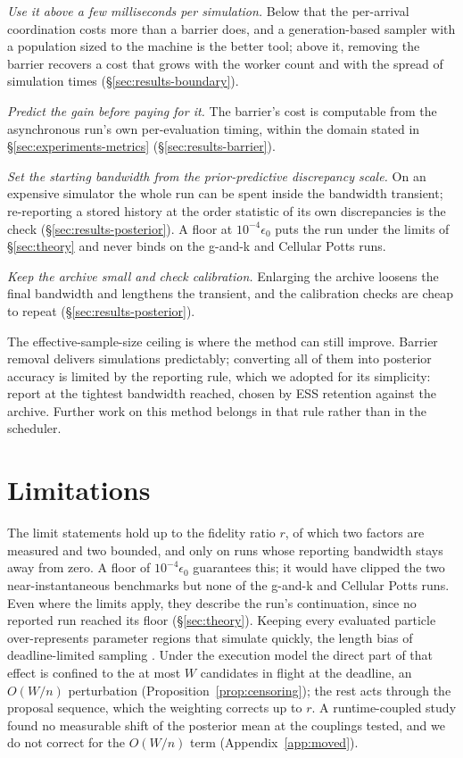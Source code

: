 \documentclass[10pt]{article}
\theoremstyle{plain}
\theoremstyle{definition}
\begin{document}
\emph{Use it above a few milliseconds per simulation.} Below that the per-arrival coordination costs more than a barrier does, and a generation-based sampler with a population sized to the machine is the better tool; above it, removing the barrier recovers a cost that grows with the worker count and with the spread of simulation times (\S\ref{sec:results-boundary}).

\emph{Predict the gain before paying for it.} The barrier's cost is computable from the asynchronous run's own per-evaluation timing, within the domain stated in \S\ref{sec:experiments-metrics} (\S\ref{sec:results-barrier}).

\emph{Set the starting bandwidth from the prior-predictive discrepancy scale.} On an expensive simulator the whole run can be spent inside the bandwidth transient; re-reporting a stored history at the order statistic of its own discrepancies is the check (\S\ref{sec:results-posterior}). A floor at $10^{-4}\epsilon_0$ puts the run under the limits of \S\ref{sec:theory} and never binds on the g-and-k and Cellular Potts runs.

\emph{Keep the archive small and check calibration.} Enlarging the archive loosens the final bandwidth and lengthens the transient, and the calibration checks are cheap to repeat (\S\ref{sec:results-posterior}).

The effective-sample-size ceiling is where the method can still improve. Barrier removal delivers simulations predictably; converting all of them into posterior accuracy is limited by the reporting rule, which we adopted for its simplicity: report at the tightest bandwidth reached, chosen by ESS retention against the archive. Further work on this method belongs in that rule rather than in the scheduler.

\section{Limitations}\label{sec:limitations}
The limit statements hold up to the fidelity ratio $r$, of which two factors are measured and two bounded, and only on runs whose reporting bandwidth stays away from zero. A floor of $10^{-4}\epsilon_0$ guarantees this; it would have clipped the two near-instantaneous benchmarks but none of the g-and-k and Cellular Potts runs. Even where the limits apply, they describe the run's continuation, since no reported run reached its floor (\S\ref{sec:theory}). Keeping every evaluated particle over-represents parameter regions that simulate quickly, the length bias of deadline-limited sampling \citep{murray2021anytime}. Under the execution model the direct part of that effect is confined to the at most $W$ candidates in flight at the deadline, an $O(W/n)$ perturbation (Proposition~\ref{prop:censoring}); the rest acts through the proposal sequence, which the weighting corrects up to $r$. A runtime-coupled study found no measurable shift of the posterior mean at the couplings tested, and we do not correct for the $O(W/n)$ term (Appendix~\ref{app:moved}).
\end{document}
